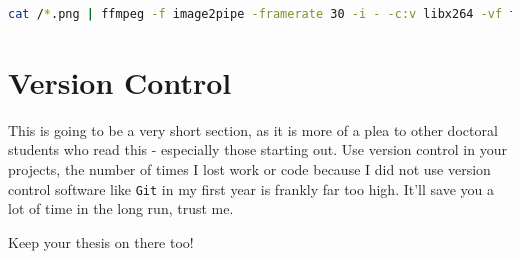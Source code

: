 \begin{lstlisting}[language=bash]
cat /*.png | ffmpeg -f image2pipe -framerate 30 -i - -c:v libx264 -vf format=yuv420p output.mp4
\end{lstlisting}

\section{Version Control}

This is going to be a very short section, as it is more of a plea to other doctoral students who read this - especially those starting out.
Use version control in your projects, the number of times I lost work or code because I did not use version control software like \texttt{Git} in my first year is frankly far too high.
It'll save you a lot of time in the long run, trust me.

\begin{center}
  Keep your thesis on there too!
\end{center}